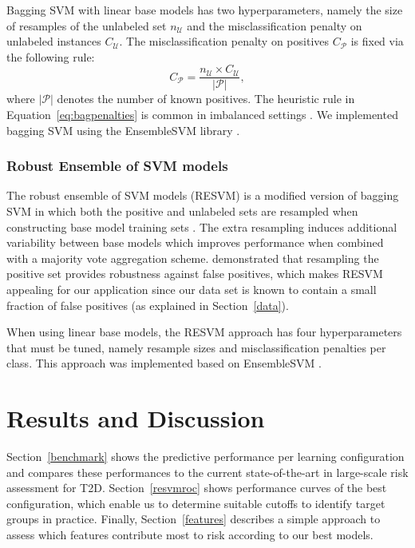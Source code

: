 \documentclass[twoside,11pt]{article}
\begin{document}
Bagging SVM with linear base models has two hyperparameters, namely the size of resamples of the unlabeled set $n_\mathcal{U}$ and the misclassification penalty on unlabeled instances $C_\mathcal{U}$. The misclassification penalty on positives $C_\mathcal{P}$ is fixed via the following rule:
\begin{equation}
C_{\mathcal{P}} = \frac{n_{\mathcal{U}} \times C_{\mathcal{U}}}{|\mathcal{P}|}, \label{eq:bagpenalties}
\end{equation}
where $|\mathcal{P}|$ denotes the number of known positives. The heuristic rule in Equation~\ref{eq:bagpenalties} is common in imbalanced settings \citep{cawley2006leave,daemen2009kernel}. We implemented bagging SVM using the EnsembleSVM library \citep{ensemblesvm-jmlr}.

\subsubsection{Robust Ensemble of SVM models}
The robust ensemble of SVM models (RESVM) is a modified version of bagging SVM in which both the positive and unlabeled sets are resampled when constructing base model training sets \citep{Claesen2015resvm}. The extra resampling induces additional variability between base models which improves performance when combined with a majority vote aggregation scheme. \citet{Claesen2015resvm} demonstrated that resampling the positive set provides robustness against false positives, which makes RESVM appealing for our application since our data set is known to contain a small fraction of false positives (as explained in Section~\ref{data}).

When using linear base models, the RESVM approach has four hyperparameters that must be tuned, namely resample sizes and misclassification penalties per class. This approach was implemented based on EnsembleSVM \citep{ensemblesvm-jmlr}.


%
%

\section{Results and Discussion}
Section~\ref{benchmark} shows the predictive performance per learning configuration and compares these performances to the current state-of-the-art in large-scale risk assessment for T2D. Section~\ref{resvmroc} shows performance curves of the best configuration, which enable us to determine suitable cutoffs to identify target groups in practice. Finally, Section~\ref{features} describes a simple approach to assess which features contribute most to risk according to our best models.
\end{document}
